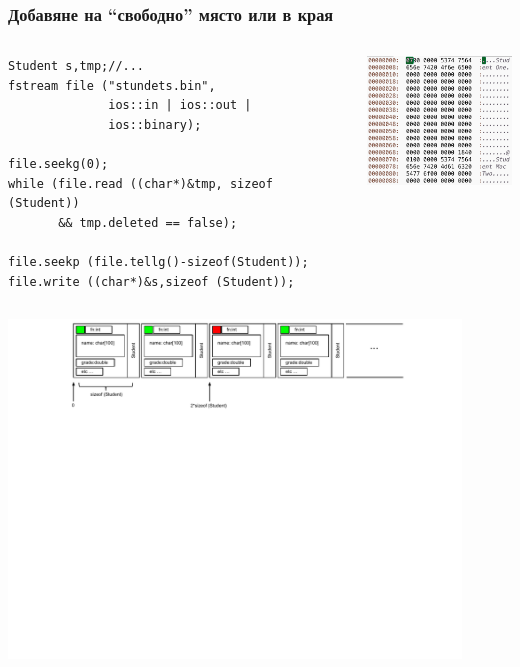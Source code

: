 \documentclass{beamer}
\begin{document}
\begin{frame}[fragile]
\frametitle{Добавяне на ``свободно'' място или в края}

\vspace{-20px}



\begin{columns}[t]
  \begin{column}{0.65\textwidth}

\begin{flushleft}
\begin{lstlisting}
Student s,tmp;//...
fstream file ("stundets.bin", 
              ios::in | ios::out | 
              ios::binary);

file.seekg(0);
while (file.read ((char*)&tmp, sizeof (Student)) 
       && tmp.deleted == false);

file.seekp (file.tellg()-sizeof(Student));
file.write ((char*)&s,sizeof (Student));
\end{lstlisting}
\end{flushleft}   


  \end{column}
  \begin{column}{0.35\textwidth}
\begin{flushright}
  \includegraphics[width=4.0cm]{images/binfiless}
\end{flushright}

  \end{column}
\end{columns}

\vspace{10px}
\includegraphics[width=12cm]{images/binfileflag}


\end{frame}
\end{document}
